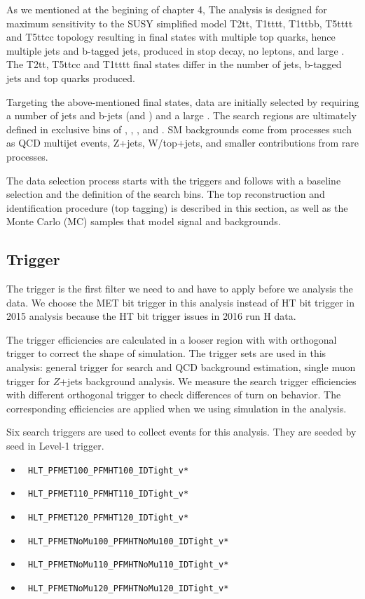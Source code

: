 As we mentioned at the begining of chapter 4, The analysis is designed for maximum sensitivity to the SUSY simplified model T2tt, T1tttt, T1ttbb, T5tttt and T5ttcc topology resulting in final states with multiple top quarks, hence multiple jets and b-tagged jets, produced in stop decay, no leptons, and large \MET. The T2tt, T5ttcc and T1tttt final states differ in the number of jets, b-tagged jets and top quarks produced. 

Targeting the above-mentioned final states, data are initially selected by requiring a number of jets and b-jets (\njets and \nbjets) and a large \MET. The search regions are ultimately defined in exclusive bins of \ntops, \nbjets, \HT, \MET and \MTTwo. SM backgrounds come from processes such as \ttbar QCD multijet events, Z+jets, W/top+jets, and smaller contributions from rare processes.

The data selection process starts with the triggers and follows with a baseline selection and the definition of the search bins. The top reconstruction and identification procedure (top tagging) is described in this section, as well as the Monte Carlo (MC) samples that model signal and backgrounds.

\subsection{Trigger}
\label{sec:trig}

The trigger is the first filter we need to and have to apply before we analysis the data. We choose the MET bit trigger in this analysis instead of HT bit trigger in 2015 analysis because the HT bit trigger issues in 2016 run H data. 

The trigger efficiencies are calculated in a looser region with with orthogonal trigger to correct the shape of simulation. The trigger sets are used in this analysis: general trigger for search and QCD background estimation, single muon trigger for $Z$+jets background analysis. We measure the search trigger efficiencies with different orthogonal trigger to check differences of turn on behavior. The corresponding efficiencies are applied when we using simulation in the analysis.

Six search triggers are used to collect events for this analysis. They are seeded by \MET seed in Level-1 trigger. 
\begin{itemize}
\item \texttt{ HLT\_PFMET100\_PFMHT100\_IDTight\_v*}
\item \texttt{ HLT\_PFMET110\_PFMHT110\_IDTight\_v*}
\item \texttt{ HLT\_PFMET120\_PFMHT120\_IDTight\_v*}
\item \texttt{ HLT\_PFMETNoMu100\_PFMHTNoMu100\_IDTight\_v*} 
\item \texttt{ HLT\_PFMETNoMu110\_PFMHTNoMu110\_IDTight\_v* }
\item \texttt{ HLT\_PFMETNoMu120\_PFMHTNoMu120\_IDTight\_v*}
\end{itemize}

